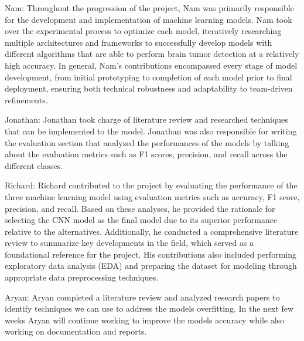 \documentclass[conference]{IEEEtran}
\begin{document}
Nam: Throughout the progression of the project, Nam was primarily responsible for the development and implementation of machine learning models. 
Nam took over the experimental process to optimize each model, iteratively researching multiple architectures and frameworks to successfully develop models with different algorithms that are able to perform brain tumor detection at a relatively high accuracy. 
In general, Nam’s contributions encompassed every stage of model development, from initial prototyping to completion of each model prior to final deployment, ensuring both technical robustness and adaptability to team-driven refinements.

Jonathan: Jonathan took charge of literature review and researched techniques that can be implemented to the model. Jonathan was also responsible for writing the evaluation section that analyzed the performances of the models by talking about the evaluation metrics such as F1 scores, precision, and recall across the different classes. 

Richard: Richard contributed to the project by evaluating the performance of the three machine learning model using evaluation metrics such as accuracy, F1 score, precision, and recall. Based on these analyses, he provided the rationale for selecting the CNN model as the final model due to its superior performance relative to the alternatives. Additionally, he conducted a comprehensive literature review to summarize key developments in the field, which served as a foundational reference for the project. His contributions also included performing exploratory data analysis (EDA) and preparing the dataset for modeling through appropriate data preprocessing techniques.

Aryan: Aryan completed a literature review and analyzed research papers to identify techniques we can use to address the models overfitting. In the next few weeks Aryan will continue working to improve the models accuracy while also working on documentation and reports. 
\end{document}
